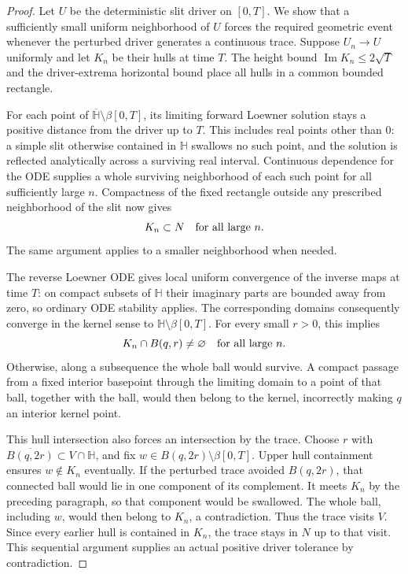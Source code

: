 \documentclass[11pt]{article}
\theoremstyle{definition}
\theoremstyle{remark}
\numberwithin{equation}{section}
\begin{document}
\begin{proof}
Let $U$ be the deterministic slit driver on $[0,T]$.  We show that a
sufficiently small uniform neighborhood of $U$ forces the required
geometric event whenever the perturbed driver generates a continuous
trace.  Suppose $U_n\to U$ uniformly and let $K_n$ be their hulls at
time $T$.  The height bound $\operatorname{Im}K_n\le2\sqrt T$ and
the driver-extrema horizontal bound place all hulls in a common
bounded rectangle.

For each point of
$\overline{\mathbb H}\setminus\beta[0,T]$, its limiting forward
Loewner solution stays a positive distance from the driver up to
$T$.  This includes real points other than $0$: a simple slit
otherwise contained in $\mathbb H$ swallows no such point, and the
solution is reflected analytically across a surviving real interval.
Continuous dependence for the ODE supplies a whole surviving
neighborhood of each such point for all sufficiently large $n$.
Compactness of the fixed rectangle outside any prescribed neighborhood
of the slit now gives
\[
                  K_n\subset N\quad\hbox{for all large }n.
\]
The same argument applies to a smaller neighborhood when needed.

The reverse Loewner ODE gives local uniform convergence of the
inverse maps at time $T$: on compact subsets of $\mathbb H$ their
imaginary parts are bounded away from zero, so ordinary ODE
stability applies.  The corresponding domains consequently converge
in the kernel sense to $\mathbb H\setminus\beta[0,T]$.  For every
small $r>0$, this implies
\[
                 K_n\cap B(q,r)\ne\varnothing
                 \quad\hbox{for all large }n.
\]
Otherwise, along a subsequence the whole ball would survive.  A
compact passage from a fixed interior basepoint through the limiting
domain to a point of that ball, together with the ball, would then
belong to the kernel, incorrectly making $q$ an interior kernel
point.

This hull intersection also forces an intersection by the trace.
Choose $r$ with $\overline{B(q,2r)}\subset V\cap\mathbb H$, and
fix $w\in B(q,2r)\setminus\beta[0,T]$.  Upper hull containment
ensures $w\notin K_n$ eventually.  If the perturbed trace avoided
$B(q,2r)$, that connected ball would lie in one component of its
complement.  It meets $K_n$ by the preceding paragraph, so that
component would be swallowed.  The whole ball, including $w$, would
then belong to $K_n$, a contradiction.  Thus the trace visits $V$.
Since every earlier hull is contained in $K_n$, the trace stays in
$N$ up to that visit.  This sequential argument supplies an actual
positive driver tolerance by contradiction.


\end{proof}
\end{document}
